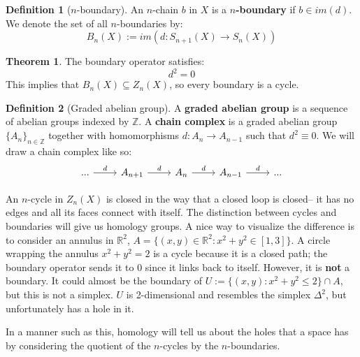 \documentclass[12pt, oneside]{article}   	%
\theoremstyle{definition}
\newtheorem{definition}{Definition}[section]
\newtheorem{theorem}{Theorem}[section]
\begin{document}
\begin{definition}[$n$-boundary]
	An $n$-chain $b$ in $X$ is a \textbf{$n$-boundary} if $b\in im(d)$. We denote the set of all 
	$n$-boundaries by:
	\begin{equation}
		B_n(X) := im(d : S_{n + 1}(X)\rightarrow S_n(X))
	\end{equation}
\end{definition}

\begin{theorem}
	The boundary operator satisfies:
	\begin{equation}
		d^2 = 0
	\end{equation}
	This implies that $B_n(X)\subseteq Z_n(X)$, so every boundary is a cycle. 
\end{theorem}

\begin{definition}[Graded abelian group]
	A \textbf{graded abelian group} is a sequence of abelian groups indexed by $\mathbb Z$. A 
	\textbf{chain complex} is a graded abelian group $\{A_n\}_{n\in\mathbb Z}$ together with 
	homomorphisms $d : A_n\rightarrow A_{n - 1}$ such that $d^2\equiv 0$. We will draw a chain 
	complex like so:
	\begin{equation}\begin{tikzcd}
			...\arrow[r, "d"] & A_{n + 1}\arrow[r, "d"] & A_n\arrow[r, "d"] & A_{n - 1}\arrow[r, "d"] & ...
	\end{tikzcd}\end{equation}
\end{definition}

An $n$-cycle in $Z_n(X)$ is closed in the way that a closed loop is closed-- it has no edges and all its 
faces connect with itself. The distinction between cycles and boundaries will give us homology groups. 
A nice way to visualize the difference is to consider an annulus in $\mathbb R^2$, $A = \{(x, y)\in\mathbb 
R^2 : x^2 + y^2\in [1, 3]\}$. A circle wrapping the annulus $x^2 + y^2 = 2$ is a cycle because it is a 
closed path; the boundary operator sends it to 0 since it links back to itself. However, it is \textbf{not} 
a boundary. It could almost be the boundary of $U := \{(x, y) : x^2 + y^2 \leq 2\}\cap A$, but this is not a 
simplex. $U$ is 2-dimensional and resembles the simplex $\Delta^2$, but unfortunately has a hole in it. 

In a manner such as this, homology will tell us about the holes that a space has by considering the 
quotient of the $n$-cycles by the $n$-boundaries. 
\end{document}
